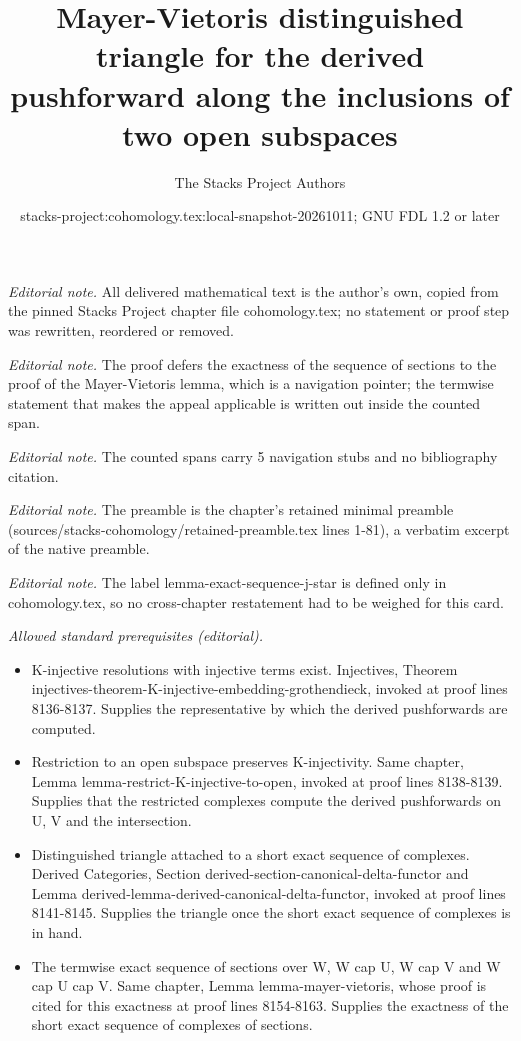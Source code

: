 \documentclass[10pt,a4paper]{amsart}
\title{Mayer-Vietoris distinguished triangle for the derived pushforward along the inclusions of two open subspaces}
\author{The Stacks Project Authors}
\date{stacks-project:cohomology.tex:local-snapshot-20261011; GNU FDL 1.2 or later}
\theoremstyle{plain}
\theoremstyle{definition}
\theoremstyle{remark}
\numberwithin{equation}{subsection}
\begin{document}
\maketitle
\noindent\textit{Editorial note.} All delivered mathematical text is the author's own, copied from the pinned Stacks Project chapter file cohomology.tex; no statement or proof step was rewritten, reordered or removed.\par\medskip
\noindent\textit{Editorial note.} The proof defers the exactness of the sequence of sections to the proof of the Mayer-Vietoris lemma, which is a navigation pointer; the termwise statement that makes the appeal applicable is written out inside the counted span.\par\medskip
\noindent\textit{Editorial note.} The counted spans carry 5 navigation stubs and no bibliography citation.\par\medskip
\noindent\textit{Editorial note.} The preamble is the chapter's retained minimal preamble (sources/stacks-cohomology/retained-preamble.tex lines 1-81), a verbatim excerpt of the native preamble.\par\medskip
\noindent\textit{Editorial note.} The label lemma-exact-sequence-j-star is defined only in cohomology.tex, so no cross-chapter restatement had to be weighed for this card.\par\medskip
\noindent\textit{Allowed standard prerequisites (editorial).}\begin{itemize}
\item K-injective resolutions with injective terms exist. Injectives, Theorem injectives-theorem-K-injective-embedding-grothendieck, invoked at proof lines 8136-8137. Supplies the representative by which the derived pushforwards are computed.
\item Restriction to an open subspace preserves K-injectivity. Same chapter, Lemma lemma-restrict-K-injective-to-open, invoked at proof lines 8138-8139. Supplies that the restricted complexes compute the derived pushforwards on U, V and the intersection.
\item Distinguished triangle attached to a short exact sequence of complexes. Derived Categories, Section derived-section-canonical-delta-functor and Lemma derived-lemma-derived-canonical-delta-functor, invoked at proof lines 8141-8145. Supplies the triangle once the short exact sequence of complexes is in hand.
\item The termwise exact sequence of sections over W, W cap U, W cap V and W cap U cap V. Same chapter, Lemma lemma-mayer-vietoris, whose proof is cited for this exactness at proof lines 8154-8163. Supplies the exactness of the short exact sequence of complexes of sections.
\end{itemize}\medskip
\end{document}
